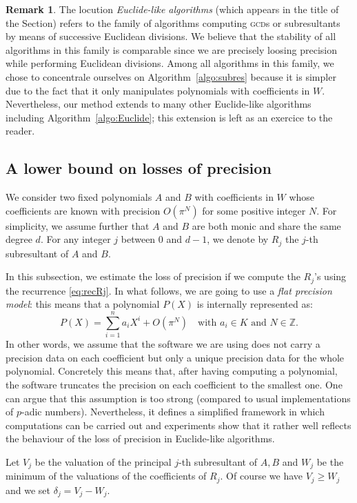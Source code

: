 \documentclass{jT}
\numberwithin{equation}{section}
\theoremstyle{definition}
\newtheorem{rem}[theo]{Remark}
\newcommand{\Z}{\mathbb Z}
\newcommand{\A}{W}
\begin{document}
\begin{rem}
The locution \emph{Euclide-like algorithms} (which appears in the 
title of the Section) refers to the family of
algorithms computing \textsc{gcd}s or subresultants by means of successive
Euclidean divisions. We believe that the stability of all algorithms in
this family is comparable since we are precisely loosing precision
while performing Euclidean divisions.
Among all algorithms in this family, we chose to concentrale ourselves
on Algorithm~\ref{algo:subres} because it is simpler due to the fact
that it only manipulates polynomials with coefficients in $\A$.
Nevertheless, our method extends to many other Euclide-like algorithms
including Algorithm~\ref{algo:Euclide}; this extension is left as an exercice to
the reader.
\end{rem}

\subsection{A lower bound on losses of precision}
\label{subsec:lowerbound}

We consider two fixed polynomials $A$ and $B$ with coefficients in $\A$ 
whose coefficients are known with precision $O(\pi^N)$ for some positive
integer $N$. For simplicity, we assume further that $A$ and $B$ are both
monic and share the same degree $d$. 
For any integer $j$ between $0$ and $d-1$, we denote by $R_j$ the $j$-th 
subresultant of $A$ and $B$.

In this subsection, we estimate the loss of precision if we compute the 
$R_j$'s using the recurrence \eqref{eq:recRj}.
In what follows, we are going to use a \emph{flat precision model}: this 
means that a polynomial $P(X)$ is internally represented as:
$$P(X) = \sum_{i=1}^n a_i X^i + O(\pi^N)
\quad \text{with } a_i \in K \text{ and } N \in \Z.$$
In other words, we assume that the software we are using does not
carry a precision data on each coefficient but only a unique precision
data for the whole polynomial. Concretely this means that, after having
computing a polynomial, the software truncates the precision on each
coefficient to the smallest one.
One can argue that this assumption is too strong (compared to usual
implementations of $p$-adic numbers). Nevertheless, it defines a 
simplified framework in which computations can be carried out and experiments 
show that it rather well reflects the behaviour of the loss of precision 
in Euclide-like algorithms.

Let $V_j$ be the valuation of the principal $j$-th subresultant of $A,B$ 
and $W_j$ be the minimum of the valuations of the coefficients of $R_j$. 
Of course we have $V_j \geq W_j$ and we set $\delta_j = V_j - W_j$.
\end{document}

